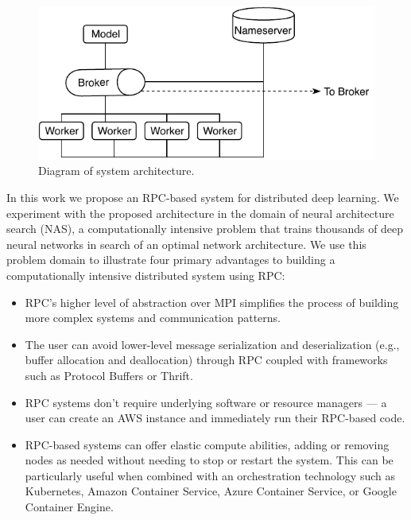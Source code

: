 \documentclass[conference]{IEEEtran}
\begin{document}
\begin{figure}
  \centering
  \includegraphics[width=.85\columnwidth]{img/system-arch.pdf}
  \caption{Diagram of system architecture.}
  \label{fig:sys-arch}
\end{figure}
In this work we propose an RPC-based system for distributed deep learning. We
experiment with the proposed architecture in the domain of neural architecture
search (NAS), a computationally intensive problem that trains thousands of deep
neural networks in search of an optimal network architecture.  We use this
problem domain to illustrate four primary advantages to building a
computationally intensive distributed system using RPC:
\begin{itemize}
\item RPC's higher level of abstraction over MPI simplifies the process of
  building more complex systems and communication patterns.
\item The user can avoid lower-level message serialization and deserialization
  (e.g., buffer allocation and deallocation)
  through RPC coupled with frameworks such as Protocol Buffers or Thrift.
\item RPC systems don't require underlying software or resource managers --- a
  user can create an AWS instance and immediately run their RPC-based code.
\item RPC-based systems can offer elastic compute abilities, adding or removing
  nodes as needed without needing to stop or restart the system. This can be
  particularly useful when combined with an orchestration technology such as
  Kubernetes, Amazon Container Service, Azure Container Service, or Google
  Container Engine.
\end{itemize}
\end{document}
